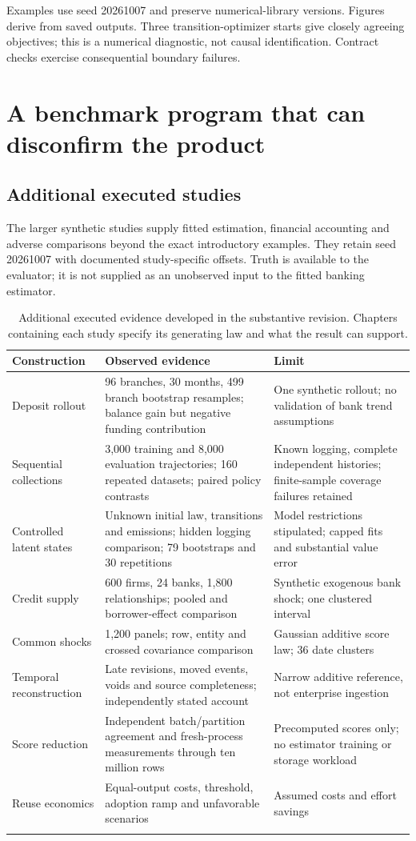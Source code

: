 Examples use seed 20261007 and preserve numerical-library versions.
Figures derive from saved outputs. Three transition-optimizer starts give
closely agreeing objectives; this is a numerical diagnostic, not causal
identification. Contract checks exercise consequential boundary failures.

\section{A benchmark program that can disconfirm the product}
\subsection{Additional executed studies}
The larger synthetic studies supply fitted estimation, financial accounting
and adverse comparisons beyond the exact introductory examples. They retain
seed 20261007 with documented study-specific offsets. Truth is available
to the evaluator; it is not supplied as an unobserved input to the fitted
banking estimator.

\begin{longtable}{P{34mm}P{60mm}P{48mm}}
\toprule Construction & Observed evidence & Limit\\\midrule\endhead
Deposit rollout & 96 branches, 30 months, 499 branch bootstrap resamples;
balance gain but negative funding contribution & One synthetic rollout;
no validation of bank trend assumptions\\
Sequential collections & 3,000 training and 8,000 evaluation trajectories;
160 repeated datasets; paired policy contrasts & Known logging, complete
independent histories; finite-sample coverage failures retained\\
Controlled latent states & Unknown initial law, transitions and emissions;
hidden logging comparison; 79 bootstraps and 30 repetitions & Model
restrictions stipulated; capped fits and substantial value error\\
Credit supply & 600 firms, 24 banks, 1,800 relationships;
pooled and borrower-effect comparison & Synthetic exogenous bank shock;
one clustered interval\\
Common shocks & 1,200 panels; row, entity and crossed covariance
comparison & Gaussian additive score law; 36 date clusters\\
Temporal reconstruction & Late revisions, moved events, voids and source
completeness; independently stated account & Narrow additive reference,
not enterprise ingestion\\
Score reduction & Independent batch/partition agreement and fresh-process
measurements through ten million rows & Precomputed scores only; no
estimator training or storage workload\\
Reuse economics & Equal-output costs, threshold, adoption ramp and
unfavorable scenarios & Assumed costs and effort savings\\
\bottomrule
\caption{Additional executed evidence developed in the substantive
revision. Chapters containing each study specify its generating law and
what the result can support.}
\label{tab:revision-evidence}
\end{longtable}

